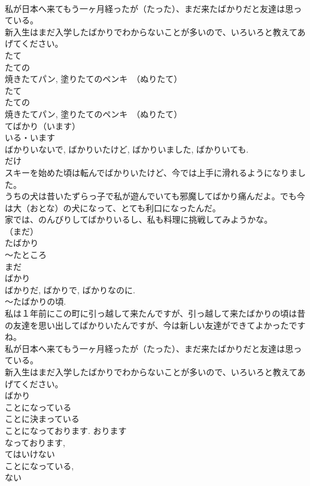 \documentclass[8pt]{extreport}
\begin{document}
\begin{CJK}{UTF8}{min}
\\	私が日本へ来てもう一ヶ月経ったが（たった）、まだ来たばかりだと友達は思っている。
\\	新入生はまだ入学したばかりでわからないことが多いので、いろいろと教えてあげてください。
\\	たて
\\	たての
\\	焼きたてパン, 塗りたてのペンキ　（ぬりたて）　
\\	たて
\\	たての
\\	焼きたてパン, 塗りたてのペンキ　（ぬりたて） 
\\	てばかり（います）
\\	いる・います 
\\	ばかりいないで, ばかりいたけど, ばかりいました, ばかりいても.
\\	だけ
\\	スキーを始めた頃は転んでばかりいたけど、今では上手に滑れるようになりました。
\\	うちの犬は昔いたずらっ子で私が遊んでいても邪魔してばかり痛んだよ。でも今は大（おとな）の犬になって、とても利口になったんだ。
\\	家では、のんびりしてばかりいるし、私も料理に挑戦してみようかな。
\\	（まだ）
\\	たばかり
\\	～たところ
\\	まだ 
\\	ばかり 
\\	ばかりだ, ばかりで, ばかりなのに.
\\	～たばかりの頃. 
\\	私は１年前にこの町に引っ越して来たんですが、引っ越して来たばかりの頃は昔の友達を思い出してばかりいたんですが、今は新しい友達ができてよかったですね。
\\	私が日本へ来てもう一ヶ月経ったが（たった）、まだ来たばかりだと友達は思っている。
\\	新入生はまだ入学したばかりでわからないことが多いので、いろいろと教えてあげてください。
\\	ばかり
\\	ことになっている
\\	ことに決まっている 
\\	ことになっております. おります 
\\	なっております, 
\\	てはいけない
\\	ことになっている, 
\\	ない

\end{CJK}
\end{document}
